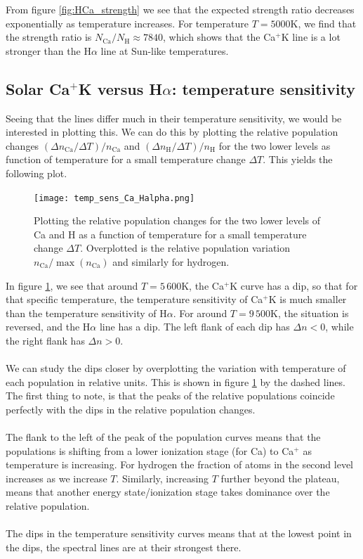 \documentclass{article}
\begin{document}
From figure \ref{fig:HCa_strength} we see that the expected strength ratio decreases exponentially as temperature increases. For temperature $T = 5000$K, we find that the strength ratio is $N_{\text{Ca}}/N_{\text{H}} \approx 7840$, which shows that the Ca$^+$K line is a lot stronger than the H$\alpha$ line at Sun-like temperatures.
\subsection{Solar Ca$^+$K versus H$\alpha$: temperature sensitivity}
Seeing that the lines differ much in their temperature sensitivity, we would be interested in plotting this. We can do this by plotting the relative population changes $(\Delta n_{\text{Ca}}/\Delta T)/n_{\text{Ca}}$ and $(\Delta n_{\text{H}}/\Delta T)/n_{\text{H}}$ for the two lower levels as function of temperature for a small temperature change $\Delta T$. This yields the following plot.
\begin{figure}[H]
  \centering
  \texttt{[image: temp\_sens\_Ca\_Halpha.png]}
  \caption{Plotting the relative population changes for the two lower levels of Ca and H as a function of temperature for a small temperature change $\Delta T$. Overplotted is the relative population variation $n_{\text{Ca}}/\max(n_{\text{Ca}})$ and similarly for hydrogen.}
  \label{fig:temp_sens}
\end{figure}
In figure \ref{fig:temp_sens}, we see that around $T = 5\,600$K, the Ca$^+$K curve has a dip, so that for that specific temperature, the temperature sensitivity of Ca$^+$K is much smaller than the temperature sensitivity of H$\alpha$. For around $T = 9\,500$K, the situation is reversed, and the H$\alpha$ line has a dip. The left flank of each dip has $\Delta n < 0$, while the right flank has $\Delta n > 0$.\\\\
We can study the dips closer by overplotting the variation with temperature of each population in relative units. This is shown in figure \ref{fig:temp_sens} by the dashed lines. The first thing to note, is that the peaks of the relative populations coincide perfectly with the dips in the relative population changes.\\\\
The flank to the left of the peak of the population curves means that the populations is shifting from a lower ionization stage (for Ca) to Ca$^+$ as temperature is increasing. For hydrogen the fraction of atoms in the second level increases as we increase $T$. Similarly, increasing $T$ further beyond the plateau, means that another energy state/ionization stage takes dominance over the relative population.\\\\
The dips in the temperature sensitivity curves means that at the lowest point in the dips, the spectral lines are at their strongest there.
\end{document}
